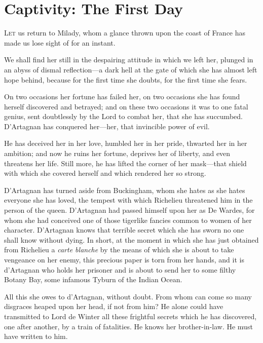 
\chapter{Captivity: The First Day}

\lettrine[]{L}{et} us return to Milady, whom a glance thrown upon the coast of France has made us lose sight of for an instant. 

\zz
We shall find her still in the despairing attitude in which we left her, plunged in an abyss of dismal reflection---a dark hell at the gate of which she has almost left hope behind, because for the first time she doubts, for the first time she fears. 

On two occasions her fortune has failed her, on two occasions she has found herself discovered and betrayed; and on these two occasions it was to one fatal genius, sent doubtlessly by the Lord to combat her, that she has succumbed. D'Artagnan has conquered her---her, that invincible power of evil. 

He has deceived her in her love, humbled her in her pride, thwarted her in her ambition; and now he ruins her fortune, deprives her of liberty, and even threatens her life. Still more, he has lifted the corner of her mask---that shield with which she covered herself and which rendered her so strong. 

D'Artagnan has turned aside from Buckingham, whom she hates as she hates everyone she has loved, the tempest with which Richelieu threatened him in the person of the queen. D'Artagnan had passed himself upon her as De Wardes, for whom she had conceived one of those tigerlike fancies common to women of her character. D'Artagnan knows that terrible secret which she has sworn no one shall know without dying. In short, at the moment in which she has just obtained from Richelieu a \textit{carte blanche} by the means of which she is about to take vengeance on her enemy, this precious paper is torn from her hands, and it is d'Artagnan who holds her prisoner and is about to send her to some filthy Botany Bay, some infamous Tyburn of the Indian Ocean. 

All this she owes to d'Artagnan, without doubt. From whom can come so many disgraces heaped upon her head, if not from him? He alone could have transmitted to Lord de Winter all these frightful secrets which he has discovered, one after another, by a train of fatalities. He knows her brother-in-law. He must have written to him. 

